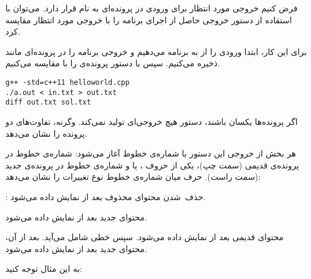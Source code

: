 \documentclass{utap}
\begin{document}
    فرض کنیم خروجی مورد انتظار برای ورودی  در پرونده‌ای به نام  قرار دارد. می‌توان با استفاده از دستور  خروجی حاصل از اجرای برنامه را با خروجی مورد انتظار مقایسه کرد.

    برای این کار، ابتدا ورودی را از  به برنامه می‌دهیم و خروجی برنامه را در پرونده‌ای مانند  ذخیره می‌کنیم. سپس با دستور  پرونده‌ی  را با  مقایسه می‌کنیم.
    \begin{latin}%
    \begin{Verbatim}[fontsize=\small]
g++ -std=c++11 helloworld.cpp
./a.out < in.txt > out.txt
diff out.txt sol.txt
    \end{Verbatim}
    \end{latin}

    اگر پرونده‌ها یکسان باشند، دستور  هیچ خروجی‌ای تولید نمی‌کند. وگرنه، تفاوت‌های دو پرونده را نشان می‌دهد.

    هر بخش از خروجی این دستور با شماره‌ی خطوط آغاز می‌شود: شماره‌ی خطوط در پرونده‌ی قدیمی (سمت چپ)، یکی از حروف ،  یا  و شماره‌ی خطوط در پرونده‌ی جدید (سمت راست). حرف میان شماره‌ی خطوط نوع تغییرات را نشان می‌دهد:
    \begin{description}[leftmargin=8em,style=nextline,font=\labelitemi\quad\bfseries]
        \item[\lr{\texttt{d}}: حذف~شدن]
        محتوای محذوف بعد از \lr{\lstinline[language=diff]{<}} نمایش داده می‌شود.
        \item[\lr{\texttt{a}}: افزوده~شدن]
        محتوای جدید بعد از \lr{\lstinline[language=diff]{>}} نمایش داده می‌شود.
        \item[\lr{\texttt{c}}: تغییر]
        محتوای قدیمی بعد از \lr{\lstinline[language=diff]{<}} نمایش داده می‌شود.
        سپس خطی شامل \lr{\lstinline[language=diff]{---}} می‌آید.
        بعد از آن، محتوای جدید بعد از \lr{\lstinline[language=diff]{>}} نمایش داده می‌شود.
    \end{description}

    به این مثال توجه کنید:
    \begin{latin}%
    \centering
    \begin{minipage}[t]{0.28\textwidth}
    \end{minipage}%
    \begin{minipage}[t]{0.28\textwidth}
    \end{minipage}%
    \begin{minipage}[t]{0.28\textwidth}
    
    \end{minipage}
    \end{latin}    
\end{document}
